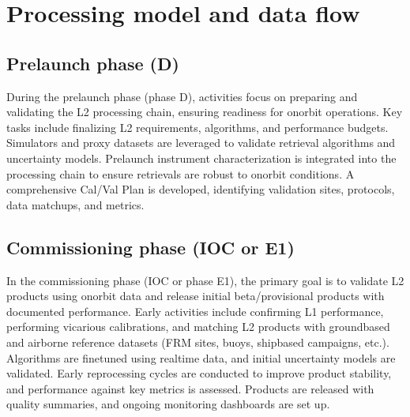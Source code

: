 \documentclass[a4paper,10pt,english]{sphinxmanual}
\begin{document}
\sphinxstepscope


\chapter{Processing model and data flow}
\label{\detokenize{02_processing_model:processing-model-and-data-flow}}\label{\detokenize{02_processing_model::doc}}

\section{Pre\sphinxhyphen{}launch phase (D)}
\label{\detokenize{02_processing_model:pre-launch-phase-d}}
\sphinxAtStartPar
During the pre\sphinxhyphen{}launch phase (phase D), activities focus on preparing and
validating the L2 processing chain, ensuring readiness for on\sphinxhyphen{}orbit operations.
Key tasks include finalizing L2 requirements, algorithms, and performance
budgets. Simulators and proxy datasets are leveraged to validate retrieval
algorithms and uncertainty models. Pre\sphinxhyphen{}launch instrument characterization is
integrated into the processing chain to ensure retrievals are robust to on\sphinxhyphen{}orbit
conditions. A comprehensive Cal/Val Plan is developed, identifying validation
sites, protocols, data matchups, and metrics.


\section{Commissioning phase (IOC or E1)}
\label{\detokenize{02_processing_model:commissioning-phase-ioc-or-e1}}
\sphinxAtStartPar
In the commissioning phase (IOC or phase E1), the primary goal is to validate
L2 products using on\sphinxhyphen{}orbit data and release initial beta/provisional products
with documented performance. Early activities include confirming L1
performance, performing vicarious calibrations, and matching L2 products with
ground\sphinxhyphen{}based and airborne reference datasets (FRM sites, buoys, ship\sphinxhyphen{}based
campaigns, etc.). Algorithms are fine\sphinxhyphen{}tuned using real\sphinxhyphen{}time data, and initial
uncertainty models are validated. Early reprocessing cycles are conducted to
improve product stability, and performance against key metrics is assessed.
Products are released with quality summaries, and ongoing monitoring dashboards
are set up.
\end{document}
